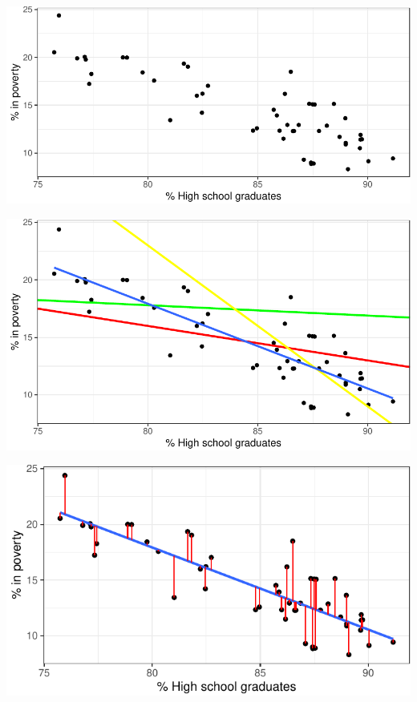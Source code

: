\documentclass[]{article}
\begin{document}
\includegraphics{forchapter5_files/figure-latex/05-poverty-1.pdf}

\includegraphics{forchapter5_files/figure-latex/05-eyeball-1.pdf}

\includegraphics{forchapter5_files/figure-latex/05-minerror-1.pdf}
\end{document}
